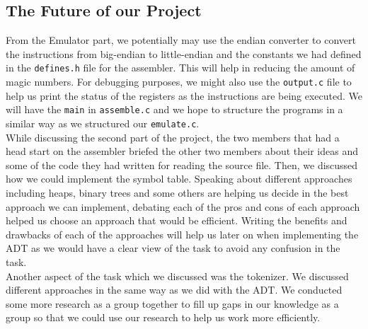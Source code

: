 \documentclass[10pt]{article}
\begin{document}
\subsection{The Future of our Project}
From the Emulator part, we potentially may use the endian converter to convert the instructions from big-endian to little-endian and the constants we had defined in the {\tt{defines.h}} file for the assembler. This will help in reducing the amount of magic numbers. For debugging purposes, we might also use the {\tt{output.c}} file to help us print the status of the registers as the instructions are being executed. We will have the {\tt{main}} in {\tt{assemble.c}} and we hope to structure the programs in a similar way as we structured our {\tt{emulate.c}}.
\\While discussing the second part of the project, the two members that had a head start on the assembler briefed the other two members about their ideas and some of the code they had written for reading the source file. Then, we discussed how we could implement the symbol table. Speaking about different approaches including heaps, binary trees and some others are helping us decide in the best approach we can implement, debating each of the pros and cons of each approach helped us choose an approach that would be efficient. Writing the benefits and drawbacks of each of the approaches will help us later on when implementing the ADT as we would have a clear view of the task to avoid any confusion in the task.
\\Another aspect of the task which we discussed was the tokenizer. We discussed different approaches in the same way as we did with the ADT. We conducted some more research as a group together to fill up gaps in our knowledge as a group so that we could use our research to help us work more efficiently.
\end{document}
